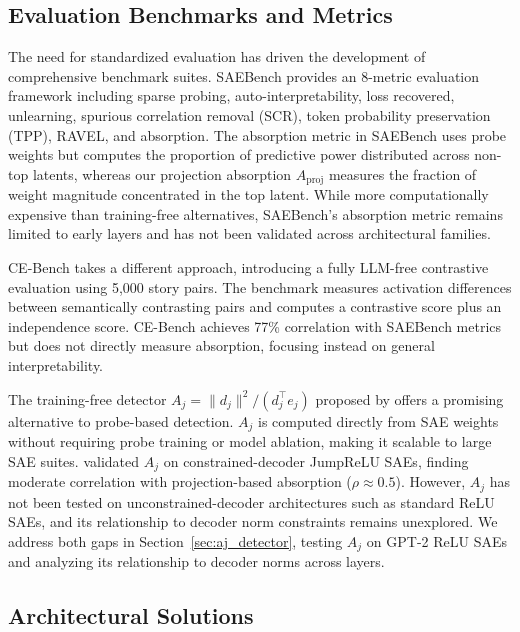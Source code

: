 \documentclass{article}
\begin{document}
\subsection{Evaluation Benchmarks and Metrics}

The need for standardized evaluation has driven the development of comprehensive benchmark suites. SAEBench \citep{karvonen2025saebench} provides an 8-metric evaluation framework including sparse probing, auto-interpretability, loss recovered, unlearning, spurious correlation removal (SCR), token probability preservation (TPP), RAVEL, and absorption. The absorption metric in SAEBench uses probe weights but computes the proportion of predictive power distributed across non-top latents, whereas our projection absorption $A_{\text{proj}}$ measures the fraction of weight magnitude concentrated in the top latent. While more computationally expensive than training-free alternatives, SAEBench's absorption metric remains limited to early layers and has not been validated across architectural families.

CE-Bench \citep{peng2025cebench} takes a different approach, introducing a fully LLM-free contrastive evaluation using 5,000 story pairs. The benchmark measures activation differences between semantically contrasting pairs and computes a contrastive score plus an independence score. CE-Bench achieves 77\% correlation with SAEBench metrics but does not directly measure absorption, focusing instead on general interpretability.

The training-free detector $A_j = \|d_j\|^2 / (d_j^\top e_j)$ proposed by \citet{chanin2024feature} offers a promising alternative to probe-based detection. $A_j$ is computed directly from SAE weights without requiring probe training or model ablation, making it scalable to large SAE suites. \citet{chanin2024feature} validated $A_j$ on constrained-decoder JumpReLU SAEs, finding moderate correlation with projection-based absorption ($\rho \approx 0.5$). However, $A_j$ has not been tested on unconstrained-decoder architectures such as standard ReLU SAEs, and its relationship to decoder norm constraints remains unexplored. We address both gaps in Section~\ref{sec:aj_detector}, testing $A_j$ on GPT-2 ReLU SAEs and analyzing its relationship to decoder norms across layers.

\subsection{Architectural Solutions}
\end{document}
